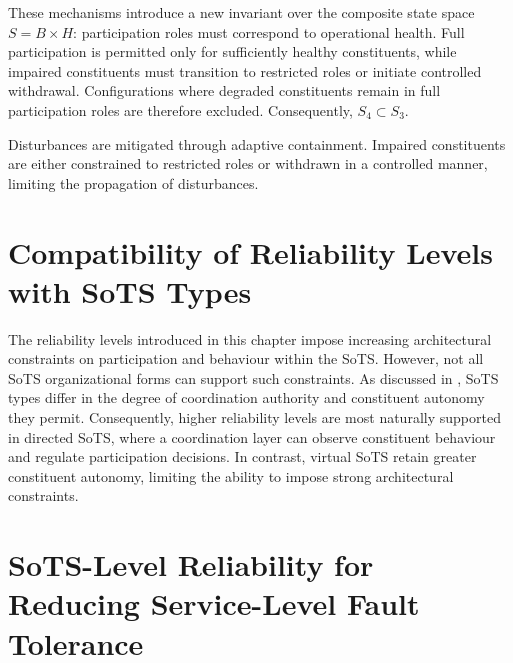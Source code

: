These mechanisms introduce a new invariant over the composite state space \(S = B \times H\): participation roles must correspond to operational health. Full participation is permitted only for sufficiently healthy constituents, while impaired constituents must transition to restricted roles or initiate controlled withdrawal. Configurations where degraded constituents remain in full participation roles are therefore excluded. Consequently, \(S_4 \subset S_3\).

Disturbances are mitigated through adaptive containment. Impaired constituents are either constrained to restricted roles or withdrawn in a controlled manner, limiting the propagation of disturbances.


\section{Compatibility of Reliability Levels with SoTS Types}



The reliability levels introduced in this chapter impose increasing architectural constraints on participation and behaviour within the SoTS. However, not all SoTS organizational forms can support such constraints. As discussed in , SoTS types differ in the degree of coordination authority and constituent autonomy they permit. Consequently, higher reliability levels are most naturally supported in directed SoTS, where a coordination layer can observe constituent behaviour and regulate participation decisions. In contrast, virtual SoTS retain greater constituent autonomy, limiting the ability to impose strong architectural constraints.


\section{SoTS-Level Reliability for Reducing Service-Level Fault Tolerance}

